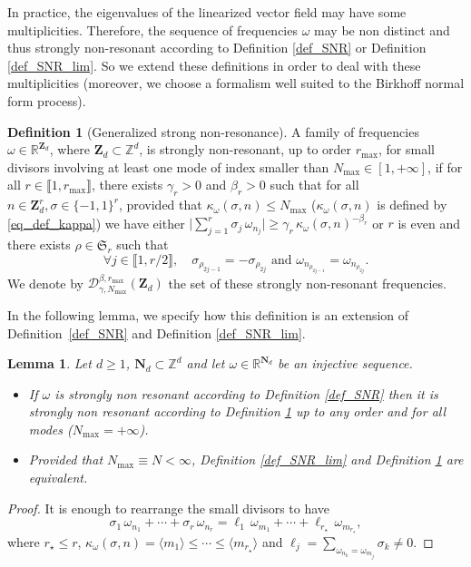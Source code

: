 \documentclass[JEP,XML,SOM,Unicode,NoEqCountersInSection,published]{cedram}
\newtheorem{lemma}[theorem]{Lemma}
\theoremstyle{definition}
\newtheorem{definition}[theorem]{Definition}
\begin{document}
In practice, the eigenvalues of the linearized vector field may have some multiplicities. Therefore, the sequence of frequencies $\omega$ may be non distinct and thus strongly non-resonant according to Definition \ref{def_SNR} or Definition \ref{def_SNR_lim}. So we extend these definitions in order to deal with these multiplicities (moreover, we choose a formalism well suited to the Birkhoff normal form process).
\begin{definition}[Generalized strong non-resonance] \label{def_nonres} A family of frequencies $\omega\in \mathbb{R}^{\mathbf{Z}_d}$, where $\mathbf{Z}_d \subset \mathbb{Z}^d$, is strongly non-resonant, up to order $r_{\max}$, for small divisors involving at least one mode of index smaller than $N_{\max}\in [1,+\infty]$, if for all $r \in \llbracket 1,r_{\max} \rrbracket $, there exists $\gamma_r>0$ and $\beta_r>0$ such that for all $n \in \mathbf{Z}_d^{r}, \sigma \in \{ -1,1\}^{r}$, provided that $\kappa_\omega(\sigma,n)\leq N_{\max}$ ($\kappa_\omega(\sigma,n)$ is defined by \eqref{eq_def_kappa})
we have either
$
\big|\sum_{j=1}^{r} \sigma_j \, \omega_{n_j}\big| \geq \gamma_r \, \kappa_\omega(\sigma,n)^{-\beta_r}
$
or $r$ is even and there exists $\rho \in \mathfrak{S}_{r}$ such that
\[
\forall j \in \llbracket 1,r/2\rrbracket, \quad \sigma_{\rho_{2j-1}}= -\sigma_{\rho_{2j}} \text{ and } \omega_{n_{\rho_{2j-1}}}=\omega_{n_{\rho_{2j}}}.
\]
We denote by $\mathcal{D}_{\gamma,N_{\max}}^{\beta,r_{\max}}(\mathbf{Z}_d)$ the set of these strongly non-resonant frequencies.
\end{definition}
In the following lemma, we specify how this definition is an extension of Definition~\ref{def_SNR} and Definition \ref{def_SNR_lim}.

\begin{lemma} \label{lem_defs_equiv} Let $d\geq 1$, $\mathbf{N}_d \subset \mathbb{Z}^d$ and let $\omega \in \mathbb{R}^{\mathbf{N}_d}$ be an injective sequence.
\begin{itemize}
\item
If $\omega$ is strongly non resonant according to Definition \ref{def_SNR} then it is strongly non resonant according to Definition \ref{def_nonres} up to any order and for all modes (\ie $N_{\max} = +\infty$).

\item
Provided that $N_{\max}\equiv N<\infty$, Definition \ref{def_SNR_lim} and Definition \ref{def_nonres} are equivalent.
\end{itemize}
\end{lemma}
\begin{proof} It is enough to rearrange the small divisors to have
\[
\sigma_1 \, \omega_{n_1} + \cdots + \sigma_r \, \omega_{n_r} = \ell_1 \, \omega_{m_1} + \cdots + \ell_{r_\star} \, \omega_{m_{r_\star}},
\]
where $r_\star\leq r$, $\kappa_\omega(\sigma,n) = \langle m_1 \rangle \leq \cdots \leq \langle m_{r_{\star}} \rangle$ and $\ell_j =\sum_{\omega_{n_k} = \omega_{m_j}} \sigma_k \neq 0$.
\end{proof}
\end{document}
